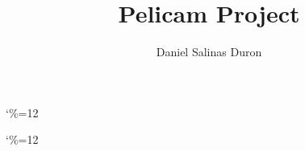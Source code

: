 \documentclass{tufte-book}
\title{Pelicam Project}
\author{Daniel Salinas Duron}
\begin{document}
\maketitle 

\frontmatter


{\catcode`\%=12 }

{\catcode`\%=12 }
\end{document}
